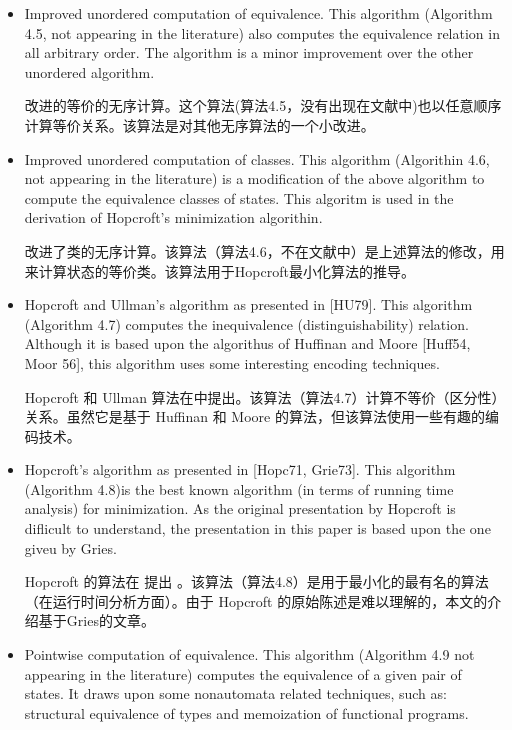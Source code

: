 \begin{itemize}

    \item Improved unordered computation of equivalence. This algorithm (Algorithm 4.5, not appearing in the literature) also computes the equivalence relation in all arbitrary order. The algorithm is a minor improvement over the other unordered algorithm.
 
    改进的等价的无序计算。这个算法(算法4.5，没有出现在文献中)也以任意顺序计算等价关系。该算法是对其他无序算法的一个小改进。

    \item Improved unordered computation of classes. This algorithm (Algorithin 4.6, not appearing in the literature) is a modification of the above algorithm to compute the equivalence classes of states. This algoritm is used in the derivation of Hopcroft's minimization algorithin.
 
     改进了类的无序计算。该算法（算法4.6，不在文献中）是上述算法的修改，用来计算状态的等价类。该算法用于Hopcroft最小化算法的推导。

    \item Hopcroft and Ullman's algorithm as presented in [HU79]. This algorithm (Algorithm 4.7) computes the inequivalence (distinguishability) relation. Although it is based upon the algorithus of Huffinan and Moore [Huff54, Moor 56], this algorithm uses some interesting encoding techniques.
 
    Hopcroft 和 Ullman 算法在\cite{Hu79}中提出。该算法（算法4.7）计算不等价（区分性）关系。虽然它是基于 Huffinan \cite{Huff54}和 Moore \cite{Moor56} 的算法，但该算法使用一些有趣的编码技术。

    \item Hopcroft's algorithm as presented in [Hopc71, Grie73]. This algorithm (Algorithm 4.8)is the best known algorithm (in terms of running time analysis) for minimization. As the original presentation by Hopcroft is diflicult to understand, the presentation in this paper is based upon the one giveu by Gries.
 
    Hopcroft 的算法在 \cite{Hopc71, Grie73} 提出 。该算法（算法4.8）是用于最小化的最有名的算法（在运行时间分析方面）。由于 Hopcroft 的原始陈述是难以理解的，本文的介绍基于Gries的文章。

    \item Pointwise computation of equivalence. This algorithm (Algorithm 4.9 not appearing in the literature) computes the equivalence of a given pair of states. It draws upon some nonautomata related techniques, such as: structural equivalence of types and memoization of functional programs.
 

\end{itemize}
